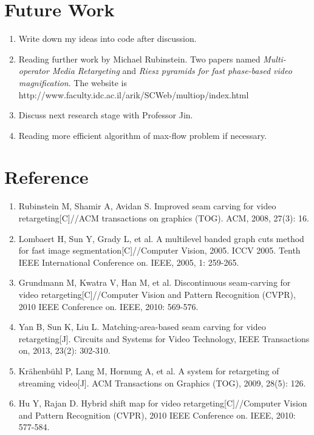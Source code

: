 \documentclass[a4paper, twocolumn]{article}
\begin{document}
	\section{Future Work}
	\begin{enumerate}[(1)]
		\item Write down my ideas into code after discussion.
		\item Reading further work by Michael Rubinstein. Two papers named \textit{Multi-operator Media Retargeting} and \textit{Riesz pyramids for fast phase-based video magnification}. The website is {http://www.faculty.idc.ac.il/arik/SCWeb/multiop/index.html}
		\item Discuss next research stage with Professor Jin.
		\item Reading more efficient algorithm of max-flow problem if necessary.
	\end{enumerate}
	
	\section{Reference}
		\begin{enumerate}[(1)]
			\item Rubinstein M, Shamir A, Avidan S. Improved seam carving for video retargeting[C]//ACM transactions on graphics (TOG). ACM, 2008, 27(3): 16.
			
			\item Lombaert H, Sun Y, Grady L, et al. A multilevel banded graph cuts method for fast image segmentation[C]//Computer Vision, 2005. ICCV 2005. Tenth IEEE International Conference on. IEEE, 2005, 1: 259-265.
			
			\item Grundmann M, Kwatra V, Han M, et al. Discontinuous seam-carving for video retargeting[C]//Computer Vision and Pattern Recognition (CVPR), 2010 IEEE Conference on. IEEE, 2010: 569-576.
			
			\item Yan B, Sun K, Liu L. Matching-area-based seam carving for video retargeting[J]. Circuits and Systems for Video Technology, IEEE Transactions on, 2013, 23(2): 302-310.
			
			\item Krähenbühl P, Lang M, Hornung A, et al. A system for retargeting of streaming video[J]. ACM Transactions on Graphics (TOG), 2009, 28(5): 126.
			
			\item Hu Y, Rajan D. Hybrid shift map for video retargeting[C]//Computer Vision and Pattern Recognition (CVPR), 2010 IEEE Conference on. IEEE, 2010: 577-584.
		\end{enumerate}
			
			
\end{document}
